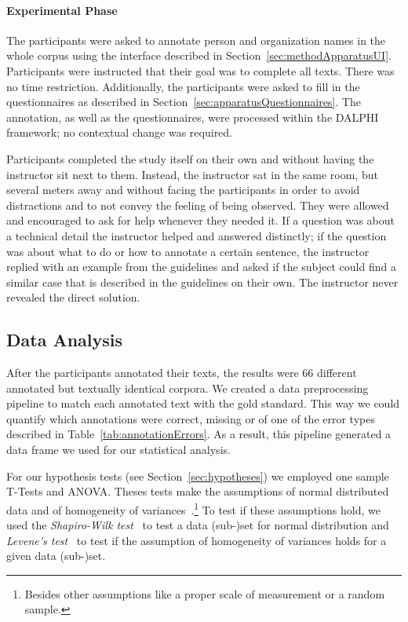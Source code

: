 		\paragraph{Experimental Phase}
			The participants were asked to annotate person and organization names in the whole corpus using the interface described in Section~\ref{sec:methodApparatusUI}. Participants were instructed that their goal was to complete all texts. There was no time restriction. Additionally, the participants were asked to fill in the questionnaires as described in Section~\ref{sec:apparatusQuestionnaires}. The annotation, as well as the questionnaires, were processed within the \ac{DALPHI} framework; no contextual change was required.

			Participants completed the study itself on their own and without having the instructor sit next to them. Instead, the instructor sat in the same room, but several meters away and without facing the participants in order to avoid distractions and to not convey the feeling of being observed. They were allowed and encouraged to ask for help whenever they needed it. If a question was about a technical detail the instructor helped and answered distinctly; if the question was about what to do or how to annotate a certain sentence, the instructor replied with an example from the guidelines and asked if the subject could find a similar case that is described in the guidelines on their own. The instructor never revealed the direct solution.

	\subsection{Data Analysis}
		After the participants annotated their texts, the results were 66 different annotated but textually identical corpora. We created a data preprocessing pipeline to match each annotated text with the gold standard. This way we could quantify which annotations were correct, missing or of one of the error types described in Table~\ref{tab:annotationErrors}. As a result, this pipeline generated a data frame we used for our statistical analysis.

		For our hypothesis tests (see Section~\ref{sec:hypotheses}) we employed one sample T-Tests and ANOVA. Theses tests make the assumptions of normal distributed data and of homogeneity of variances~\cite{field2012discovering}.\footnote{Besides other assumptions like a proper scale of measurement or a random sample.}
		To test if these assumptions hold, we used the \textit{Shapiro-Wilk test}~\cite{shapiro1965analysis} to test a data (sub-)set for normal distribution and \textit{Levene's test}~\cite{levene1960robust} to test if the assumption of homogeneity of variances holds for a given data (sub-)set.

